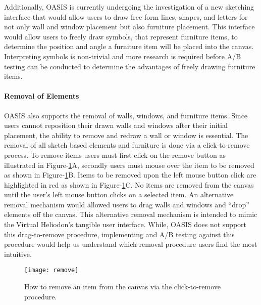 Additionally, OASIS is currently undergoing the investigation of a new sketching interface that would allow users to draw free form lines, shapes, and letters for not only wall and window placement but also furniture placement.
This interface would allow users to freely draw symbols, that represent furniture items, to determine the position and angle a furniture item will be placed into the canvas.
Interpreting symbols is non-trivial and more research is required before A/B testing can be conducted to determine the advantages of freely drawing furniture items.


\paragraph{Removal of Elements}
OASIS also supports the removal of walls, windows, and furniture items.
Since users cannot reposition their drawn walls and windows after their initial placement, the ability to remove and redraw a wall or window is essential.
The removal of all sketch based elements and furniture is done via a click-to-remove process.
To remove items users must first click on the remove button as illustrated in Figure-\ref{fig:remove}A, secondly users must mouse over the item to be removed as shown in Figure-\ref{fig:remove}B.
Items to be removed upon the left mouse button click are highlighted in red as shown in Figure-\ref{fig:remove}C.
No items are removed from the canvas until the user's left mouse button clicks on a selected item.
An alternative removal mechanism would allowed users to drag walls and windows and ``drop'' elements off the canvas. 
This alternative removal mechanism is intended to mimic the Virtual Heliodon's tangible user interface.
While, OASIS does not support this drag-to-remove procedure,  implementing and A/B testing against this procedure would help us understand which removal procedure users find the most intuitive.

\begin{figure}[h]
\centering
\texttt{[image: remove]}
\caption{How to remove an item from the canvas via the click-to-remove procedure. 
}
\label{fig:remove}
\end{figure}

